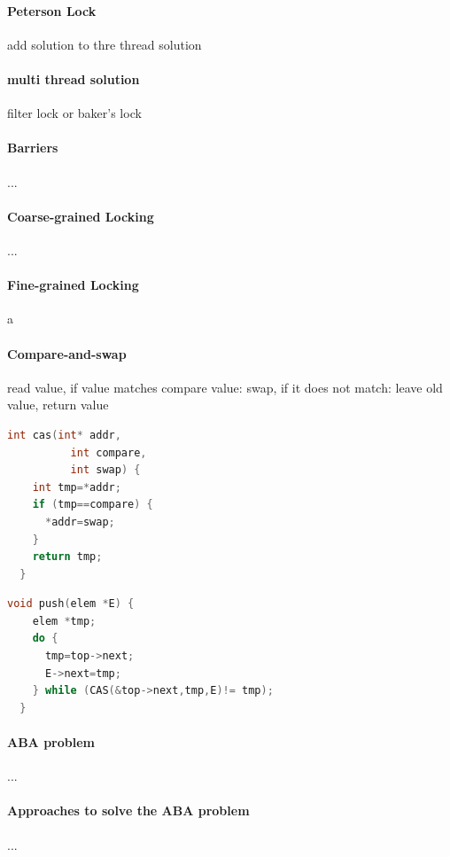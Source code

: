 \documentclass[8pt]{extarticle}
\begin{document}
\begin{multicols*}{4}
\paragraph{Peterson Lock}
add solution to thre thread solution

\paragraph{multi thread solution} filter lock or baker's lock

\paragraph{Barriers}...

\paragraph{Coarse-grained Locking} ...

\paragraph{Fine-grained Locking} a
\paragraph{Compare-and-swap} read value, if value matches compare value: swap, if it does not match: leave old value, return value  

\begin{lstlisting}[language=c, numbers=none]
  int cas(int* addr,
          int compare,
          int swap) {
    int tmp=*addr;
    if (tmp==compare) {
      *addr=swap;
    }
    return tmp;
  } 
\end{lstlisting} %

\begin{lstlisting}[language=c, numbers=none]
  void push(elem *E) {
    elem *tmp;
    do {
      tmp=top->next;
      E->next=tmp;
    } while (CAS(&top->next,tmp,E)!= tmp);
  }
\end{lstlisting} %

\paragraph{ABA problem}...

\paragraph{Approaches to solve the ABA problem}... 


\end{multicols*}
\end{document}
